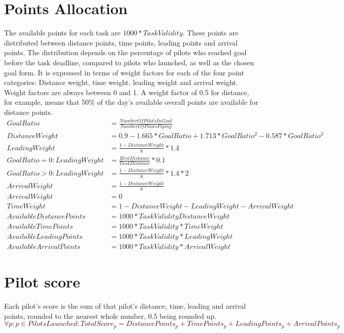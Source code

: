 \documentclass{article}
\begin{document}
\newpage
\section{Points Allocation}
The available points for each task are \(1000*TaskValidity\). These points are
distributed between distance points, time points, leading points and arrival
points. The distribution depends on the percentage of pilots who reached goal
before the task deadline, compared to pilots who launched, as well as the
chosen goal form. It is expressed in terms of weight factors for each of the
four point categories: Distance weight, time weight, leading weight and arrival
weight. Weight factors are always between 0 and 1. A weight factor of 0.5 for
distance, for example, means that 50\% of the day’s available overall points
are available for distance points.
\begin{align*}
    GoalRatio &= \frac{NumberOfPilotsInGoal}{NumberOfPilotsFlying} \\
    DistanceWeight &= 0.9 - 1.665 * GoalRatio + 1.713 * GoalRatio^2 - 0.587 * GoalRatio^3 \\
    LeadingWeight &= \frac{1 - DistanceWeight}{8} * 1.4 \\
    GoalRatio = 0 : LeadingWeight &= \frac{BestDistance}{TaskDistance} * 0.1 \\
    GoalRatio > 0 : LeadingWeight &= \frac{1 - DistanceWeight}{8} * 1.4 * 2 \\
    ArrivalWeight &= \frac{1 - DistanceWeight}{8} \\
    ArrivalWeight &= 0 \\
    TimeWeight &= 1 - DistanceWeight - LeadingWeight - ArrivalWeight \\
    AvailableDistancePoints &= 1000 * TaskValidity  DistanceWeight \\
    AvailableTimePoints &= 1000 * TaskValidity * TimeWeight \\
    AvailableLeadingPoints &= 1000 * TaskValidity * LeadingWeight \\
    AvailableArrivalPoints &= 1000 * TaskValidity * ArrivalWeight
\end{align*}

\newpage
\section{Pilot score}
Each pilot’s score is the sum of that pilot’s distance, time, leading and
arrival points, rounded to the nearest whole number, 0.5 being rounded up.
\[ \forall p : p \in PilotsLaunched : TotalScore_p = DistancePoints_p + TimePoints_p + LeadingPoints_p + ArrivalPoints_p \]
\end{document}
